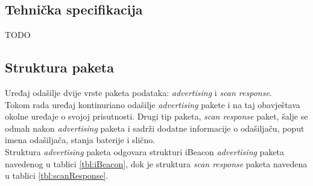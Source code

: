 \subsection*{Tehnička specifikacija}

TODO

\subsection*{Struktura paketa}
Uređaj odašilje dvije vrste paketa podataka: \textit{advertising} i \textit{scan response}.
\\
Tokom rada uređaj kontinuriano odašilje \textit{advertising} pakete i na taj obavještava okolne uređaje o svojoj prisutnosti. 
Drugi tip paketa, \textit{scan response} paket, šalje se odmah nakon \textit{advertising} paketa i sadrži dodatne informacije o odašiljaču, poput imena odašiljača, stanja baterije i slično.
\\

Struktura \textit{advertising} paketa odgovara strukturi iBeacon \textit{advertising} paketa navedenog u tablici \ref{tbl:iBeacon}, dok je struktura \textit{scan response} paketa navedena u tablici \ref{tbl:scanResponse}.
\\

